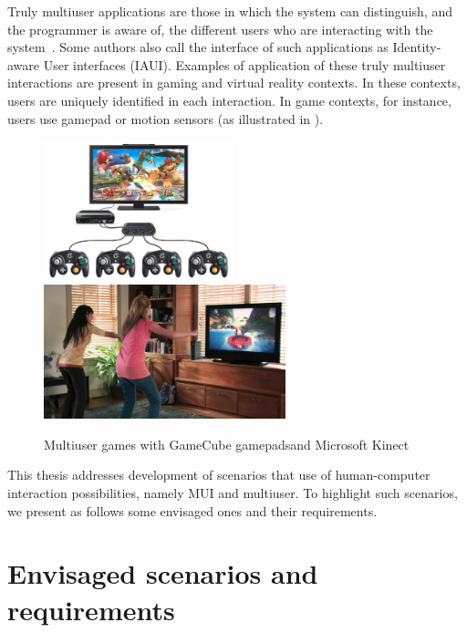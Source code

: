 Truly multiuser applications are those in which the system can distinguish, and
the programmer is aware of, the different users who are interacting with the
system~\cite{haber_modeling_2001}. Some authors \cite{laurillau} also call the
interface of
such applications as Identity-aware User interfaces (IAUI). Examples of
application of these truly multiuser interactions are present in gaming and
virtual reality contexts. In these contexts, users are uniquely identified in
each interaction. In game contexts, for instance, users use gamepad or motion
sensors (as illustrated in ).

\begin{figure}[!ht]
\begin{center}
	\includegraphics[width=5.5cm, keepaspectratio]{img/img2a.png}
	\includegraphics[width=7cm, keepaspectratio]{img/img2b.png}
	\caption[Multiuser games]{Multiuser games with GameCube
	gamepads\footnotemark and Microsoft Kinect\footnotemark}
	\label{fig:multiuser}
    \captionvspace
\end{center}
\end{figure}


This thesis addresses development of scenarios that use of human-computer
interaction possibilities, namely MUI and multiuser. To highlight such
scenarios, we present as follows some envisaged ones and their requirements.

\section{Envisaged scenarios and requirements}
\label{sec:intro:scenarios}

